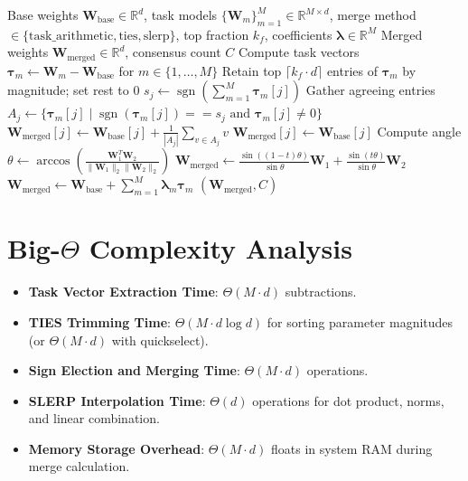 \documentclass[11pt,a4paper]{article}
\theoremstyle{definition}
\begin{document}
\begin{algorithm}[H]
\caption{Model Merging via TIES and SLERP}
\begin{algorithmic}[1]
\Require Base weights $\mathbf{W}_{\text{base}} \in \mathbb{R}^d$, task models $\{\mathbf{W}_m\}_{m=1}^M \in \mathbb{R}^{M \times d}$, merge method $\in \{\text{task\_arithmetic}, \text{ties}, \text{slerp}\}$, top fraction $k_f$, coefficients $\mathbf{\lambda} \in \mathbb{R}^M$
\Ensure Merged weights $\mathbf{W}_{\text{merged}} \in \mathbb{R}^d$, consensus count $C$
\State Compute task vectors $\mathbf{\tau}_m \gets \mathbf{W}_m - \mathbf{W}_{\text{base}}$ for $m \in \{1, \dots, M\}$
        \State Retain top $\lceil k_f \cdot d \rceil$ entries of $\mathbf{\tau}_m$ by magnitude; set rest to $0$
    \EndFor
        \State $s_j \gets \operatorname{sgn}\left(\sum_{m=1}^M \mathbf{\tau}_{m}[j]\right)$
        \State Gather agreeing entries $A_j \gets \{ \mathbf{\tau}_m[j] \mid \operatorname{sgn}(\mathbf{\tau}_m[j]) == s_j \text{ and } \mathbf{\tau}_m[j] \neq 0 \}$
            \State $\mathbf{W}_{\text{merged}}[j] \gets \mathbf{W}_{\text{base}}[j] + \frac{1}{|A_j|} \sum_{v \in A_j} v$
        \Else
            \State $\mathbf{W}_{\text{merged}}[j] \gets \mathbf{W}_{\text{base}}[j]$
        \EndIf
    \EndFor
{}
    \State Compute angle $\theta \gets \arccos\left(\frac{\mathbf{W}_1^T \mathbf{W}_2}{\|\mathbf{W}_1\|_2 \|\mathbf{W}_2\|_2}\right)$
    \State $\mathbf{W}_{\text{merged}} \gets \frac{\sin((1 - t)\theta)}{\sin \theta} \mathbf{W}_1 + \frac{\sin(t\theta)}{\sin \theta} \mathbf{W}_2$
\Else
    \State $\mathbf{W}_{\text{merged}} \gets \mathbf{W}_{\text{base}} + \sum_{m=1}^M \mathbf{\lambda}_m \mathbf{\tau}_m$
\EndIf
\State \Return $(\mathbf{W}_{\text{merged}}, C)$
\end{algorithmic}
\end{algorithm}

\section{Big-$\Theta$ Complexity Analysis}

\begin{itemize}
    \item \textbf{Task Vector Extraction Time}: $\Theta(M \cdot d)$ subtractions.
    \item \textbf{TIES Trimming Time}: $\Theta(M \cdot d \log d)$ for sorting parameter magnitudes (or $\Theta(M \cdot d)$ with quickselect).
    \item \textbf{Sign Election and Merging Time}: $\Theta(M \cdot d)$ operations.
    \item \textbf{SLERP Interpolation Time}: $\Theta(d)$ operations for dot product, norms, and linear combination.
    \item \textbf{Memory Storage Overhead}: $\Theta(M \cdot d)$ floats in system RAM during merge calculation.
\end{itemize}
\end{document}
